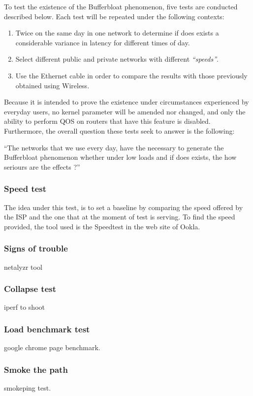 To test the existence of the Bufferbloat phenomenon, five tests are conducted 
described below. Each test will be repeated under the following contexts:

\begin{enumerate}
\item Twice on the same day in one network to determine if does exists a 
considerable variance in latency for different times of day.
\item Select different public and private networks with different 
\textit{``speeds''}.
\item Use the Ethernet cable in order to compare the results with those 
previously obtained using Wireless.
\end{enumerate}

Because it is intended to prove the existence under circumstances experienced by
everyday users, no kernel parameter will be amended nor changed, and only the 
ability to perform QOS on routers that have this feature is disabled. 
Furthermore, the overall question these tests seek to answer is the following:\\

\begin{theorem}
``The networks that we use every day, have the necessary to generate the 
Bufferbloat phenomenon whether under low loads and if does exists, the how 
seriours are the effects ?''
\end{theorem}

\subsubsection{Speed test}
The idea under this test, is to set a baseline by comparing the speed offered by
the ISP and the one that at the moment of test is serving. To find the speed 
provided, the tool used is the Speedtest in the web site of Ookla.\\


\subsubsection{Signs of trouble}
netalyzr tool\\

\subsubsection{Collapse test}
iperf to shoot\\

\subsubsection{Load benchmark test}
google chrome page benchmark.\\

\subsubsection{Smoke the path}
smokeping test.\\
